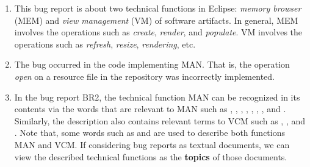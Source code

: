 
\begin{enumerate}

\item This bug report is about two technical functions in Eclipse:
  \emph{memory browser} (MEM) and \emph{view management} (VM) of
  software artifacts. In general, MEM involves the operations such as
  \emph{create}, \emph{render}, and \emph{populate}. VM involves the
  operations such as {\em refresh}, {\em resize}, {\em rendering}, etc.

\item The bug occurred in the code implementing MAN. That is, the operation
\emph{open} on a resource file in the repository was incorrectly
implemented.

\item In the bug report BR2, the technical function MAN can be recognized
in its contents via the words that are relevant to MAN such as
, , , ,
, , , and .
Similarly, the description also contains relevant terms to VCM such as
, , and . Note that, some
words such as  and  are used to describe
both functions MAN and VCM. If considering bug reports as textual
documents, we can view the described technical functions as the
\textbf{topics} of those documents.

\end{enumerate}






